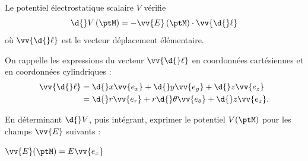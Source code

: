 
\finEntrainement



\newpage



\hauteurLargeurCadreReponse		{8mm}{2.5cm}
\initialisationEntrainement


Le potentiel électrostatique scalaire $V$ vérifie 
\[
\d{}V\left(\ptM\right)=-\vv{E}\left(\ptM\right)\cdot\vv{\d{}\ell}
\]
 où $\vv{\d{}\ell}$ est le vecteur déplacement
élémentaire.

On rappelle les expressions du vecteur $\vv{\d{}\ell}$
en coordonnées cartésiennes 
et en coordonnées cylindriques : 
\begin{align*}
\vv{\d{}\ell} & =\d{}x\vv{e_{x}}+\d{}y\vv{e_{y}}+\d{}z\vv{e_{z}} \\
           & =\d{}r\vv{e_{r}}+r\d{}\theta\vv{e_{\theta}}+\d{}z\vv{e_{z}}.
\end{align*}

En déterminant $\d{}V$, puis intégrant, exprimer le potentiel $V(\ptM)$ pour les champs $\vv{E}$ suivants : 

\debutEntrainement



\begin{enonce}
$\vv{E}(\ptM)=E\vv{e_{x}}$ 
\end{enonce}

